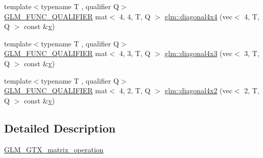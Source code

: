 \begin{DoxyCompactItemize}
\item 
{\footnotesize template$<$typename T , qualifier Q$>$ }\\\hyperlink{setup_8hpp_a33fdea6f91c5f834105f7415e2a64407}{G\+L\+M\+\_\+\+F\+U\+N\+C\+\_\+\+Q\+U\+A\+L\+I\+F\+I\+ER} mat$<$ 4, 4, T, Q $>$ \hyperlink{group__gtx__matrix__operation_ga0b4cd8dea436791b072356231ee8578f}{glm\+::diagonal4x4} (vec$<$ 4, T, Q $>$ const \&\hyperlink{_s_d_l__opengl_8h_a10a82eabcb59d2fcd74acee063775f90}{v})
\item 
{\footnotesize template$<$typename T , qualifier Q$>$ }\\\hyperlink{setup_8hpp_a33fdea6f91c5f834105f7415e2a64407}{G\+L\+M\+\_\+\+F\+U\+N\+C\+\_\+\+Q\+U\+A\+L\+I\+F\+I\+ER} mat$<$ 4, 3, T, Q $>$ \hyperlink{group__gtx__matrix__operation_gae235def5049d6740f0028433f5e13f90}{glm\+::diagonal4x3} (vec$<$ 3, T, Q $>$ const \&\hyperlink{_s_d_l__opengl_8h_a10a82eabcb59d2fcd74acee063775f90}{v})
\item 
{\footnotesize template$<$typename T , qualifier Q$>$ }\\\hyperlink{setup_8hpp_a33fdea6f91c5f834105f7415e2a64407}{G\+L\+M\+\_\+\+F\+U\+N\+C\+\_\+\+Q\+U\+A\+L\+I\+F\+I\+ER} mat$<$ 4, 2, T, Q $>$ \hyperlink{group__gtx__matrix__operation_gacb8969e6543ba775c6638161a37ac330}{glm\+::diagonal4x2} (vec$<$ 2, T, Q $>$ const \&\hyperlink{_s_d_l__opengl_8h_a10a82eabcb59d2fcd74acee063775f90}{v})
\end{DoxyCompactItemize}


\subsection{Detailed Description}
\hyperlink{group__gtx__matrix__operation}{G\+L\+M\+\_\+\+G\+T\+X\+\_\+matrix\+\_\+operation} 